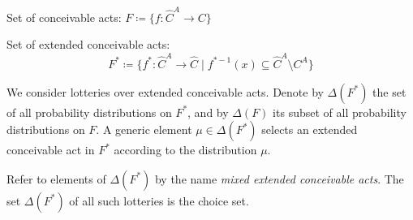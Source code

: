 \documentclass[letterpaper, 12pt]{article}
\begin{document}
Set of conceivable acts: $F \coloneq \{f : \hat{C}^A \rightarrow C\}$

Set of extended conceivable acts:
\[F^* \coloneq \{f^* : \hat{C}^A \rightarrow \hat{C} \mid
  f^{*-1}(x) \subseteq \hat{C}^A \setminus C^A \}\]

We consider lotteries over extended conceivable acts. Denote by $\Delta (F^*)$ the
set of all probability distributions on $F^*$, and by $\Delta (F)$ its subset of all
probability distributions on $F$. A generic element \(\mu \in \Delta (F^*)\) selects
an extended conceivable act in $F^*$ according to the distribution $\mu$.

Refer to elements of \(\Delta (F^*)\) by the name \emph{mixed extended conceivable acts}.
The set \(\Delta (F^*)\) of all such lotteries is the choice set.
\end{document}
